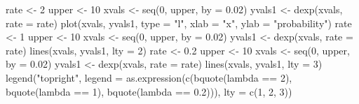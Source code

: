 \begin{Schunk}
\begin{Sinput}
 rate <- 2
 upper <- 10
 xvals <- seq(0, upper, by = 0.02)
 yvals1 <- dexp(xvals, rate = rate)
 plot(xvals, yvals1, type = "l", xlab = "x", ylab = "probability")
 rate <- 1
 upper <- 10
 xvals <- seq(0, upper, by = 0.02)
 yvals1 <- dexp(xvals, rate = rate)
 lines(xvals, yvals1, lty = 2)
 rate <- 0.2
 upper <- 10
 xvals <- seq(0, upper, by = 0.02)
 yvals1 <- dexp(xvals, rate = rate)
 lines(xvals, yvals1, lty = 3)
 legend("topright", legend = as.expression(c(bquote(lambda == 2), bquote(lambda == 
      1), bquote(lambda == 0.2))), lty = c(1, 2, 3))
\end{Sinput}
\end{Schunk}
